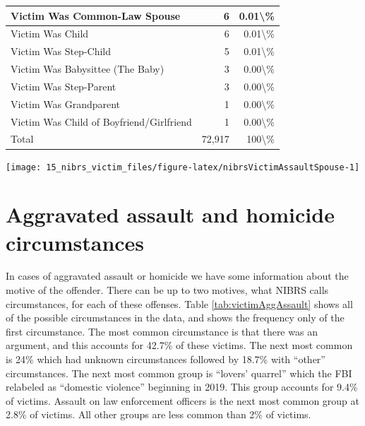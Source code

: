 \documentclass[
]{krantz}
\let\origfigure\figure
\let\endorigfigure\endfigure
\renewenvironment{figure}[1][2] {
    \expandafter\origfigure\expandafter[H]
} {
    \endorigfigure
}
\begin{document}
\begin{longtable}[t]{l|r|r}
\hline
Victim Was Common-Law Spouse & 6 & 0.01\textbackslash{}\%\\
\hline
Victim Was Child & 6 & 0.01\textbackslash{}\%\\
\hline
Victim Was Step-Child & 5 & 0.01\textbackslash{}\%\\
\hline
Victim Was Babysittee (The Baby) & 3 & 0.00\textbackslash{}\%\\
\hline
Victim Was Step-Parent & 3 & 0.00\textbackslash{}\%\\
\hline
Victim Was Grandparent & 1 & 0.00\textbackslash{}\%\\
\hline
Victim Was Child of Boyfriend/Girlfriend & 1 & 0.00\textbackslash{}\%\\
\hline
Total & 72,917 & 100\textbackslash{}\%\\
\hline
\end{longtable}

\begin{figure}

{\centering \texttt{[image: 15\_nibrs\_victim\_files/figure-latex/nibrsVictimAssaultSpouse-1]} 

}

\caption{The annual percent of assault victims whose perpetrator is their spouse, 1991-2022.}\label{fig:nibrsVictimAssaultSpouse}
\end{figure}

\section{Aggravated assault and homicide
circumstances}\label{aggravated-assault-and-homicide-circumstances}

In cases of aggravated assault or homicide we have some
information about the motive of the offender. There can be
up to two motives, what NIBRS calls circumstances, for each
of these offenses. Table \ref{tab:victimAggAssault} shows
all of the possible circumstances in the data, and shows the
frequency only of the first circumstance. The most common
circumstance is that there was an argument, and this
accounts for 42.7\% of these victims. The next most common
is 24\% which had unknown circumstances followed by 18.7\%
with ``other'' circumstances. The next most common group is
``lovers' quarrel'' which the FBI relabeled as ``domestic
violence'' beginning in 2019. This group accounts for 9.4\%
of victims. Assault on law enforcement officers is the next
most common group at 2.8\% of victims. All other groups are
less common than 2\% of victims.
\end{document}
